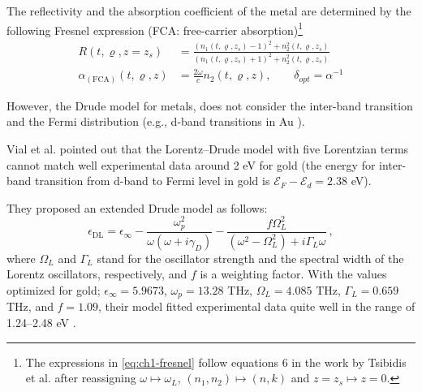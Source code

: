 The reflectivity and the absorption coefficient of the metal are determined by the following Fresnel expression
(FCA: free-carrier absorption)\footnote{
  The expressions in \ref{eq:ch1-fresnel} follow equations 6 in the work by Tsibidis et al. \cite{Tsibidis_2019} after reassigning $\omega \mapsto \omega_L$, $(n_1,n_2) \mapsto (n,k)$ and $z=z_s \mapsto z=0$.
}
\begin{subequations}\label{eq:ch1-fresnel}
  \begin{align}
    R(t,\varrho, z=z_s)                  & = \frac{(n_1(t, \varrho, z_s) - 1)^2 + n_2^2(t, \varrho, z_s)}{(n_1(t, \varrho, z_s) + 1)^2 + n_2^2(t, \varrho, z_s)}
    \label{eq:reflectivity_FCA}                                                                                                                                  \\
    \alpha_{(\text{FCA})}(t, \varrho, z) & = \frac{2 \omega}{c} n_2(t, \varrho, z), \qquad \delta_{opt} = \alpha^{-1}
    \label{eq:absorption_FCA}
  \end{align}
\end{subequations}

However, the Drude model for metals, does not consider the inter-band transition and the Fermi distribution (e.g., d-band transitions in Au \cite{Schoenlein_1987}).

Vial et al. \cite{Vial_2005} pointed out that the Lorentz--Drude model \cite{Powell_1969} with five Lorentzian terms \cite{Rakic_1998} cannot match well experimental data around 2 eV for gold
(the energy for inter-band transition from d-band to Fermi level in gold is $\mathcal{E}_F - \mathcal{E}_d = 2.38$ eV).

They proposed an extended Drude model as follows:
\begin{equation}
  \epsilon_{\text{DL}} = \epsilon_\infty - \frac{\omega_p^2}{\omega (\omega + i \gamma_D)} - \frac{f\Omega_L^2}{(\omega^2 - \Omega_L^2) + i \Gamma_L \omega} \ ,
\end{equation}
where $\Omega_L$ and $\Gamma_L$ stand for the oscillator strength and the spectral width of the Lorentz oscillators, respectively, and $f$
is a weighting factor. With the values optimized for gold;
$\epsilon_\infty = 5.9673$, $\omega_p = 13.28$ THz, $\Omega_L = 4.085$ THz, $\Gamma_L= 0.659$ THz, and $f = 1.09$, their model fitted experimental data quite well in the range of 1.24--2.48 eV \cite{Vial_2005}.

